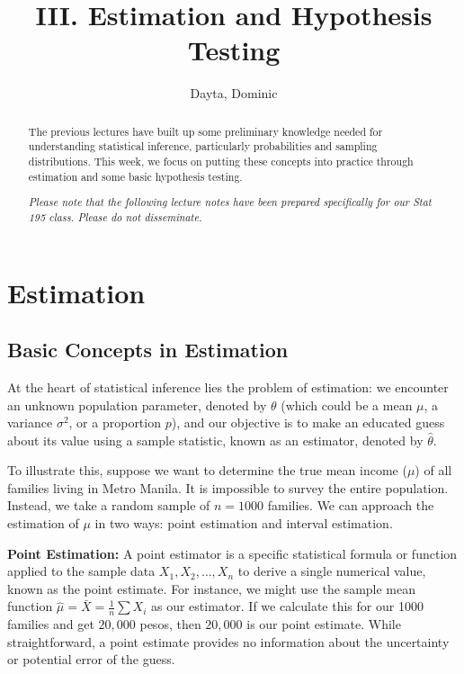 \documentclass{article}
\title{III. Estimation and Hypothesis Testing}
\author{Dayta, Dominic}
\begin{document}
\begin{titlepage}
\thispagestyle{empty}
\maketitle

\begin{abstract}
The previous lectures have built up some preliminary knowledge needed for understanding statistical inference, particularly probabilities and sampling distributions. This week, we focus on putting these concepts into practice through estimation and some basic hypothesis testing.

\textit{Please note that the following lecture notes have been prepared specifically for our Stat 195 class. Please do not disseminate.}
\end{abstract}

\tableofcontents
\end{titlepage}



\section{Estimation}
\subsection{Basic Concepts in Estimation}

At the heart of statistical inference lies the problem of estimation: we encounter an unknown population parameter, denoted by $\theta$ (which could be a mean $\mu$, a variance $\sigma^2$, or a proportion $p$), and our objective is to make an educated guess about its value using a sample statistic, known as an estimator, denoted by $\hat{\theta}$.

To illustrate this, suppose we want to determine the true mean income ($\mu$) of all families living in Metro Manila. It is impossible to survey the entire population. Instead, we take a random sample of $n = 1000$ families. We can approach the estimation of $\mu$ in two ways: point estimation and interval estimation.

\textbf{Point Estimation:} 
A point estimator is a specific statistical formula or function applied to the sample data $X_1, X_2, \dots, X_n$ to derive a single numerical value, known as the point estimate. For instance, we might use the sample mean function $\hat{\mu} = \bar{X} = \frac{1}{n}\sum X_i$ as our estimator. If we calculate this for our 1000 families and get $20,000$ pesos, then $20,000$ is our point estimate. While straightforward, a point estimate provides no information about the uncertainty or potential error of the guess.
\end{document}

